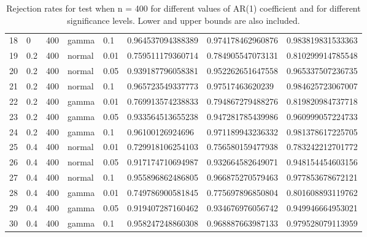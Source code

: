 \begin{table}[ht]
\begin{tabular}{rlllllll}
  18 & 0 & 400 & gamma & 0.1 & 0.964537094388389 & 0.974178462960876 & 0.983819831533363 \\ 
  19 & 0.2 & 400 & normal & 0.01 & 0.759511179360714 & 0.784905547073131 & 0.810299914785548 \\ 
  20 & 0.2 & 400 & normal & 0.05 & 0.939187796058381 & 0.952262651647558 & 0.965337507236735 \\ 
  21 & 0.2 & 400 & normal & 0.1 & 0.965723549337773 & 0.97517463620239 & 0.984625723067007 \\ 
  22 & 0.2 & 400 & gamma & 0.01 & 0.769913574238833 & 0.794867279488276 & 0.819820984737718 \\ 
  23 & 0.2 & 400 & gamma & 0.05 & 0.933564513655238 & 0.947281785439986 & 0.960999057224733 \\ 
  24 & 0.2 & 400 & gamma & 0.1 & 0.96100126924696 & 0.971189943236332 & 0.981378617225705 \\ 
  25 & 0.4 & 400 & normal & 0.01 & 0.729918106254103 & 0.756580159477938 & 0.783242212701772 \\ 
  26 & 0.4 & 400 & normal & 0.05 & 0.917174710694987 & 0.932664582649071 & 0.948154454603156 \\ 
  27 & 0.4 & 400 & normal & 0.1 & 0.955896862486805 & 0.966875270579463 & 0.977853678672121 \\ 
  28 & 0.4 & 400 & gamma & 0.01 & 0.749786900581845 & 0.775697896850804 & 0.801608893119762 \\ 
  29 & 0.4 & 400 & gamma & 0.05 & 0.919407287160462 & 0.934676976056742 & 0.949946664953021 \\ 
  30 & 0.4 & 400 & gamma & 0.1 & 0.958247248860308 & 0.968887663987133 & 0.979528079113959 \\ 
   \hline
\end{tabular}
\caption{Rejection rates for test when n = 400 for 
                   different values of AR(1) coefficient and for different 
                   significance levels. Lower and upper bounds are also 
                   included.} 
\label{table:rr_400}
\end{table}

